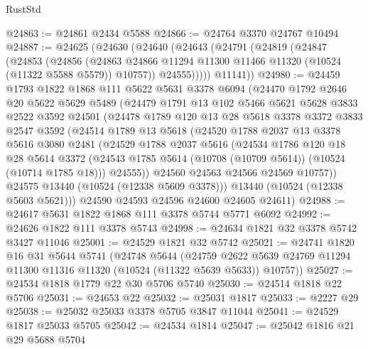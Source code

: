 \begin{lexlean}{RustStd}
\begin{coremodule}
@24863 := @24861 @2434 @5588
@24866 := @24764 @3370 @24767 @10494
@24887 := @24625
    (@24630
      (@24640
        (@24643
          (@24791
            (@24819
              (@24847
                (@24853
                  (@24856
                    (@24863
                      @24866
                      @11294
                      @11300
                      @11466
                      @11320
                      (@10524 (@11322 @5588 @5579))
                      @10757))
                  @24555)))))
        @11141))
@24980 := @24459
    @1793
    @1822
    @1868
    @111
    @5622
    @5631
    @3378
    @6094
    (@24470
      @1792
      @2646
      @20
      @5622
      @5629
      @5489
      (@24479
        @1791
        @13
        @102
        @5466
        @5621
        @5628
        @3833
        @2522
        @3592
        @24501
        (@24478
          @1789
          @120
          @13
          @28
          @5618
          @3378
          @3372
          @3833
          @2547
          @3592
          (@24514
            @1789
            @13
            @5618
            (@24520
              @1788
              @2037
              @13
              @3378
              @5616
              @3080
              @2481
              (@24529
                @1788
                @2037
                @5616
                (@24534
                  @1786
                  @120
                  @18
                  @28
                  @5614
                  @3372
                  (@24543 @1785 @5614 (@10708 (@10709 @5614)) (@10524 (@10714 @1785 @18)))
                  @24555))
              @24560
              @24563
              @24566
              @24569
              @10757))
          @24575
          @13440
          (@10524 (@12338 @5609 @3378)))
        @13440
        (@10524 (@12338 @5603 @5621)))
      @24590
      @24593
      @24596
      @24600
      @24605
      @24611)
@24988 := @24617 @5631 @1822 @1868 @111 @3378 @5744 @5771 @6092
@24992 := @24626 @1822 @111 @3378 @5743
@24998 := @24634 @1821 @32 @3378 @5742 @3427 @11046
@25001 := @24529 @1821 @32 @5742
@25021 := @24741
    @1820
    @16
    @31
    @5644
    @5741
    (@24748
      @5644
      (@24759 @2622 @5639 @24769 @11294 @11300 @11316 @11320 (@10524 (@11322 @5639 @5633)) @10757))
@25027 := @24534 @1818 @1779 @22 @30 @5706 @5740
@25030 := @24514 @1818 @22 @5706
@25031 := @24653 @22
@25032 := @25031 @1817
@25033 := @2227 @29
@25038 := @25032 @25033 @3378 @5705 @3847 @11044
@25041 := @24529 @1817 @25033 @5705
@25042 := @24534 @1814
@25047 := @25042 @1816 @21 @29 @5688 @5704

\end{coremodule}
\end{lexlean}
